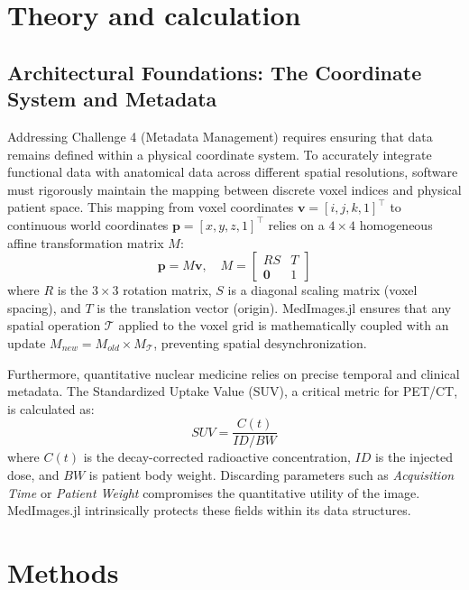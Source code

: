 \documentclass[10pt,letterpaper]{article}
\begin{document}
\section{Theory and calculation}

\subsection{Architectural Foundations: The Coordinate System and Metadata}
Addressing Challenge 4 (Metadata Management) requires ensuring that data remains defined within a physical coordinate system. To accurately integrate functional data with anatomical data across different spatial resolutions, software must rigorously maintain the mapping between discrete voxel indices and physical patient space. This mapping from voxel coordinates $\mathbf{v} = [i, j, k, 1]^\top$ to continuous world coordinates $\mathbf{p} = [x, y, z, 1]^\top$ relies on a $4 \times 4$ homogeneous affine transformation matrix $M$:
\begin{equation}
\mathbf{p} = M \mathbf{v}, \quad M = 
\begin{bmatrix} 
R S & T \\
\mathbf{0} & 1
\end{bmatrix}
\end{equation}
where $R$ is the $3 \times 3$ rotation matrix, $S$ is a diagonal scaling matrix (voxel spacing), and $T$ is the translation vector (origin). MedImages.jl ensures that any spatial operation $\mathcal{T}$ applied to the voxel grid is mathematically coupled with an update $M_{new} = M_{old} \times M_{\mathcal{T}}$, preventing spatial desynchronization.

Furthermore, quantitative nuclear medicine relies on precise temporal and clinical metadata. The Standardized Uptake Value (SUV), a critical metric for PET/CT, is calculated as:
\begin{equation}
SUV = \frac{C(t)}{ID / BW}
\end{equation}
where $C(t)$ is the decay-corrected radioactive concentration, $ID$ is the injected dose, and $BW$ is patient body weight. Discarding parameters such as \textit{Acquisition Time} or \textit{Patient Weight} compromises the quantitative utility of the image. MedImages.jl intrinsically protects these fields within its data structures.

\section{Methods}
\end{document}

